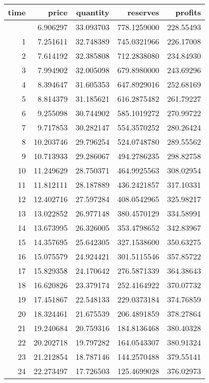 \documentclass[
]{article}
\begin{document}
\begin{longtable}[]{@{}rrrrr@{}}
\toprule\noalign{}
time & price & quantity & reserves & profits \\
\midrule\noalign{}
\endhead
\bottomrule\noalign{}
\endlastfoot
0 & 6.906297 & 33.093703 & 778.1259000 & 228.55493 \\
1 & 7.251611 & 32.748389 & 745.0321966 & 226.17008 \\
2 & 7.614192 & 32.385808 & 712.2838080 & 234.84930 \\
3 & 7.994902 & 32.005098 & 679.8980000 & 243.69296 \\
4 & 8.394647 & 31.605353 & 647.8929016 & 252.68169 \\
5 & 8.814379 & 31.185621 & 616.2875482 & 261.79227 \\
6 & 9.255098 & 30.744902 & 585.1019272 & 270.99722 \\
7 & 9.717853 & 30.282147 & 554.3570252 & 280.26424 \\
8 & 10.203746 & 29.796254 & 524.0748780 & 289.55562 \\
9 & 10.713933 & 29.286067 & 494.2786235 & 298.82758 \\
10 & 11.249629 & 28.750371 & 464.9925563 & 308.02954 \\
11 & 11.812111 & 28.187889 & 436.2421857 & 317.10331 \\
12 & 12.402716 & 27.597284 & 408.0542965 & 325.98217 \\
13 & 13.022852 & 26.977148 & 380.4570129 & 334.58991 \\
14 & 13.673995 & 26.326005 & 353.4798652 & 342.83967 \\
15 & 14.357695 & 25.642305 & 327.1538600 & 350.63275 \\
16 & 15.075579 & 24.924421 & 301.5115546 & 357.85722 \\
17 & 15.829358 & 24.170642 & 276.5871339 & 364.38643 \\
18 & 16.620826 & 23.379174 & 252.4164922 & 370.07732 \\
19 & 17.451867 & 22.548133 & 229.0373184 & 374.76859 \\
20 & 18.324461 & 21.675539 & 206.4891859 & 378.27864 \\
21 & 19.240684 & 20.759316 & 184.8136468 & 380.40328 \\
22 & 20.202718 & 19.797282 & 164.0543307 & 380.91324 \\
23 & 21.212854 & 18.787146 & 144.2570488 & 379.55141 \\
24 & 22.273497 & 17.726503 & 125.4699028 & 376.02973 \\

\end{longtable}
\end{document}
